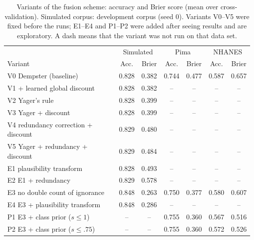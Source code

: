 \begin{table}[!ht]\centering\footnotesize\setlength{\tabcolsep}{3pt}
\caption{Variants of the fusion scheme: accuracy and Brier score (mean over cross-validation). Simulated corpus: development corpus (seed 0). Variants V0--V5 were fixed before the runs; E1--E4 and P1--P2 were added after seeing results and are exploratory. A dash means that the variant was not run on that data set.}\label{tab:ablation}
\begin{tabular}{lcccccc}\hline
 & \multicolumn{2}{c}{Simulated} & \multicolumn{2}{c}{Pima} & \multicolumn{2}{c}{NHANES}\\
 Variant & Acc. & Brier & Acc. & Brier & Acc. & Brier\\\hline
V0 Dempster (baseline) & 0.828 & 0.382 & 0.744 & 0.477 & 0.587 & 0.657 \\
V1 + learned global discount & 0.828 & 0.382 & -- & -- & -- & -- \\
V2 Yager's rule & 0.828 & 0.399 & -- & -- & -- & -- \\
V3 Yager + discount & 0.828 & 0.399 & -- & -- & -- & -- \\
V4 redundancy correction + discount & 0.829 & 0.480 & -- & -- & -- & -- \\
V5 Yager + redundancy + discount & 0.829 & 0.484 & -- & -- & -- & -- \\
E1 plausibility transform & 0.828 & 0.493 & -- & -- & -- & -- \\
E2 E1 + redundancy & 0.829 & 0.578 & -- & -- & -- & -- \\
E3 no double count of ignorance & 0.848 & 0.263 & 0.750 & 0.377 & 0.580 & 0.607 \\
E4 E3 + plausibility transform & 0.848 & 0.286 & -- & -- & -- & -- \\
P1 E3 + class prior ($s\le1$) & -- & -- & 0.755 & 0.360 & 0.567 & 0.516 \\
P2 E3 + class prior ($s\le.75$) & -- & -- & 0.755 & 0.360 & 0.572 & 0.526 \\
\hline\end{tabular}
\end{table}
